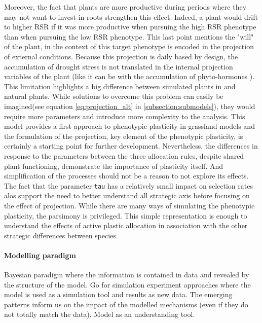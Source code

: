 Moreover, the fact that plants are more productive during periods where they may not want to invest in roots strengthen this effect. Indeed, a plant would drift to higher RSR if it was more productive when pursuing the high RSR phenotype than when pursuing the low RSR phenotype. This last point mentions the "will" of the plant, in the context of \model this target phenotype is encoded in the projection of external conditions. Because this projection is daily based by design, the accumulation of drought stress is not translated in the internal projection variables of the plant (like it can be with the accumulation of phyto-hormones \parencite{need ref}). This limitation highlights a big difference between simulated plants in \model and natural plants. While solutions to overcome this problem can easily be imagined(see equation \ref{eq:projection_alt} in \ref{subsection:submodels}), they would require more parameters and introduce more complexity to the analysis. This model provides a first approach to phenotypic plasticity in grassland models and the formulation of the projection, key element of the phenotypic plasticity, is certainly a starting point for further development. Nevertheless, the differences in response to the parameters between the three allocation rules, despite shared plant functioning, demonstrate the importance of plasticity itself. And simplification of the processes should not be a reason to not explore its effects. The fact that the parameter \texttt{tau} has a relatively small impact on selection rates alos support the need to better understand all strategic axis before focusing on the effect of projection. While there are many ways of simulating the phenotypic plasticity, the parsimony is privileged. This simple representation is enough to understand the effects of active plastic allocation in association with the other strategic differences between species.



\paragraph{Modelling paradigm}
Bayesian paradigm where the information is contained in data and revealed by the structure of the model. Go for simulation experiment approaches where the model is used as a simulation tool and results as new data. The emerging patterns inform us on the impact of the modelled mechanisms (even if they do not totally match the data). Model as an understanding tool.\\

